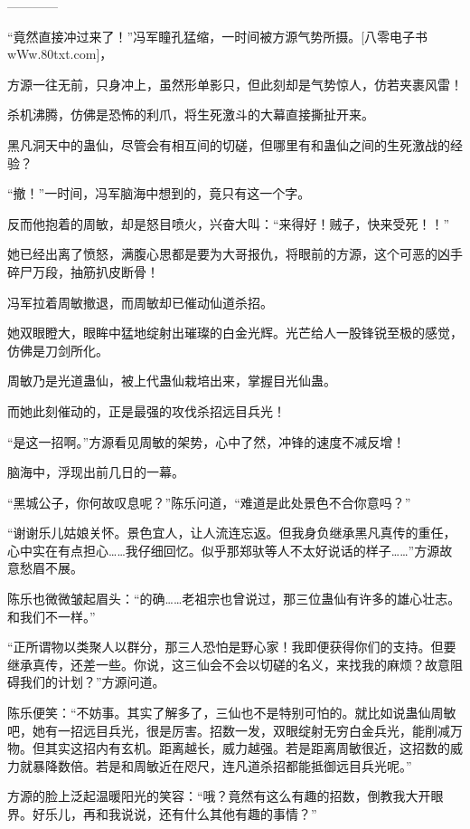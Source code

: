 
\begin{this_body}

------------

“竟然直接冲过来了！”冯军瞳孔猛缩，一时间被方源气势所摄。[八零电子书wWw.80txt.com]，

方源一往无前，只身冲上，虽然形单影只，但此刻却是气势惊人，仿若夹裹风雷！

杀机沸腾，仿佛是恐怖的利爪，将生死激斗的大幕直接撕扯开来。

黑凡洞天中的蛊仙，尽管会有相互间的切磋，但哪里有和蛊仙之间的生死激战的经验？

“撤！”一时间，冯军脑海中想到的，竟只有这一个字。

反而他抱着的周敏，却是怒目喷火，兴奋大叫：“来得好！贼子，快来受死！！”

她已经出离了愤怒，满腹心思都是要为大哥报仇，将眼前的方源，这个可恶的凶手碎尸万段，抽筋扒皮断骨！

冯军拉着周敏撤退，而周敏却已催动仙道杀招。

她双眼瞪大，眼眸中猛地绽射出璀璨的白金光辉。光芒给人一股锋锐至极的感觉，仿佛是刀剑所化。

周敏乃是光道蛊仙，被上代蛊仙栽培出来，掌握目光仙蛊。

而她此刻催动的，正是最强的攻伐杀招远目兵光！

“是这一招啊。”方源看见周敏的架势，心中了然，冲锋的速度不减反增！

脑海中，浮现出前几日的一幕。

“黑城公子，你何故叹息呢？”陈乐问道，“难道是此处景色不合你意吗？”

“谢谢乐儿姑娘关怀。景色宜人，让人流连忘返。但我身负继承黑凡真传的重任，心中实在有点担心……我仔细回忆。似乎那郑驮等人不太好说话的样子……”方源故意愁眉不展。

陈乐也微微皱起眉头：“的确……老祖宗也曾说过，那三位蛊仙有许多的雄心壮志。和我们不一样。”

“正所谓物以类聚人以群分，那三人恐怕是野心家！我即便获得你们的支持。但要继承真传，还差一些。你说，这三仙会不会以切磋的名义，来找我的麻烦？故意阻碍我们的计划？”方源问道。

陈乐便笑：“不妨事。其实了解多了，三仙也不是特别可怕的。就比如说蛊仙周敏吧，她有一招远目兵光，很是厉害。招数一发，双眼绽射无穷白金兵光，能削减万物。但其实这招内有玄机。距离越长，威力越强。若是距离周敏很近，这招数的威力就暴降数倍。若是和周敏近在咫尺，连凡道杀招都能抵御远目兵光呢。”

方源的脸上泛起温暖阳光的笑容：“哦？竟然有这么有趣的招数，倒教我大开眼界。好乐儿，再和我说说，还有什么其他有趣的事情？”


\end{this_body}
